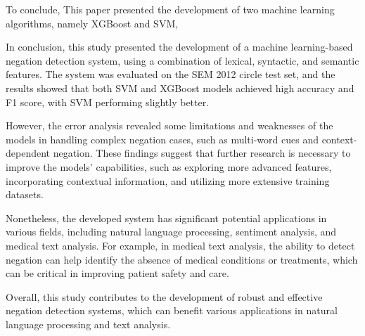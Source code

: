 To conclude, This paper presented the development of two machine learning algorithms, namely XGBoost and SVM, 





In conclusion, this study presented the development of a machine learning-based negation detection system, using a combination of lexical, syntactic, and semantic features. The system was evaluated on the SEM 2012 circle test set, and the results showed that both SVM and XGBoost models achieved high accuracy and F1 score, with SVM performing slightly better.


However, the error analysis revealed some limitations and weaknesses of the models in handling complex negation cases, such as multi-word cues and context-dependent negation. These findings suggest that further research is necessary to improve the models' capabilities, such as exploring more advanced features, incorporating contextual information, and utilizing more extensive training datasets.


Nonetheless, the developed system has significant potential applications in various fields, including natural language processing, sentiment analysis, and medical text analysis. For example, in medical text analysis, the ability to detect negation can help identify the absence of medical conditions or treatments, which can be critical in improving patient safety and care.


Overall, this study contributes to the development of robust and effective negation detection systems, which can benefit various applications in natural language processing and text analysis.